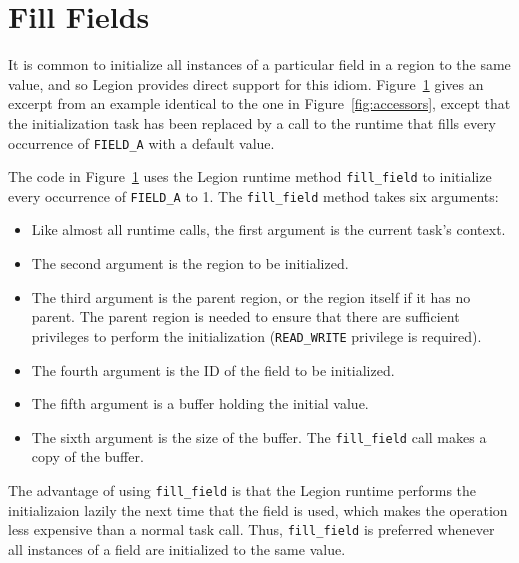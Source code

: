 \section{Fill Fields}
\label{sec:fill}

It is common to initialize all instances of a particular field in a region to the same value, and so Legion
provides direct support for this idiom.  Figure~\ref{fig:fill} gives an excerpt from an example identical
to the one in Figure~\ref{fig:accessors}, except that the initialization task has been replaced by a call to
the runtime that fills every occurrence of {\tt FIELD\_A} with a default value.

\begin{figure}
  {\small
  }
\caption{}
\label{fig:fill}
\end{figure}
The code in Figure~\ref{fig:fill} uses the Legion runtime method {\tt fill\_field} to initialize every 
occurrence of {\tt FIELD\_A} to 1.  The {\tt fill\_field} method takes six arguments:

\begin{itemize}

\item Like almost all runtime calls, the first argument is the current task's context.

\item The second argument is the region to be initialized.

\item The third argument is the parent region, or the region itself if it has no parent.  The parent region is needed
to ensure that there are sufficient privileges to perform the initialization ({\tt READ\_WRITE} privilege
is required).

\item The fourth argument is the ID of the field to be initialized.

\item The fifth argument is a buffer holding the initial value.

\item The sixth argument is the size of the buffer.  
The {\tt fill\_field} call makes a copy of the buffer.

\end{itemize}

The advantage of using {\tt fill\_field} is that the Legion runtime performs the initializaion lazily the next time that
the field is used, which makes the operation less expensive than a normal task call.  Thus, {\tt fill\_field} is preferred
whenever all instances of a field are initialized to the same value.


